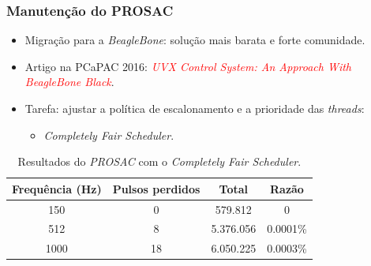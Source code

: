 \begin{frame}
\frametitle {Manutenção do PROSAC}

\begin{itemize}
  \item Migração para a \textit{BeagleBone}: solução mais barata e forte
  comunidade.
  \item Artigo na PCaPAC 2016: \textcolor{red}{\textit{UVX Control System: An
  Approach With BeagleBone Black}}.
  \item Tarefa: ajustar a política de escalonamento e a prioridade das
  \textit{threads}:
  \begin{itemize}
   \item \textit{Completely Fair Scheduler}.
   \end{itemize}
\end{itemize}

\vspace{-12pt}
\begin{table}[h]

	\centering
	\caption{\label{tab:prosac} Resultados do \textit{PROSAC} com o
	\textit{Completely Fair Scheduler}.}
	\begin{tabular}{| c | c | c | c |}
		\hline
		\textbf{Frequência (Hz)} & \textbf{Pulsos perdidos} & \textbf{Total} &
		\textbf{Razão} \\ \hline 
		150 	& 0 	& 579.812  & 0 \\ \hline
		512 	& 8 	& 5.376.056 & 0.0001\% \\ \hline
		1000 	& 18 	& 6.050.225 & 0.0003\% \\ \hline
	\end{tabular}	    
\end{table}

\end{frame}


